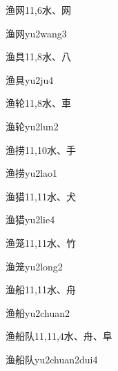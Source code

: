 \begin{entry}{渔网}{11,6}{⽔、⽹}
  \begin{phonetics}{渔网}{yu2wang3}
  \end{phonetics}
\end{entry}

\begin{entry}{渔具}{11,8}{⽔、⼋}
  \begin{phonetics}{渔具}{yu2ju4}
  \end{phonetics}
\end{entry}

\begin{entry}{渔轮}{11,8}{⽔、⾞}
  \begin{phonetics}{渔轮}{yu2lun2}
  \end{phonetics}
\end{entry}

\begin{entry}{渔捞}{11,10}{⽔、⼿}
  \begin{phonetics}{渔捞}{yu2lao1}
  \end{phonetics}
\end{entry}

\begin{entry}{渔猎}{11,11}{⽔、⽝}
  \begin{phonetics}{渔猎}{yu2lie4}
  \end{phonetics}
\end{entry}

\begin{entry}{渔笼}{11,11}{⽔、⽵}
  \begin{phonetics}{渔笼}{yu2long2}
  \end{phonetics}
\end{entry}

\begin{entry}{渔船}{11,11}{⽔、⾈}
  \begin{phonetics}{渔船}{yu2chuan2}
  \end{phonetics}
\end{entry}

\begin{entry}{渔船队}{11,11,4}{⽔、⾈、⾩}
  \begin{phonetics}{渔船队}{yu2chuan2dui4}
  \end{phonetics}
\end{entry}

